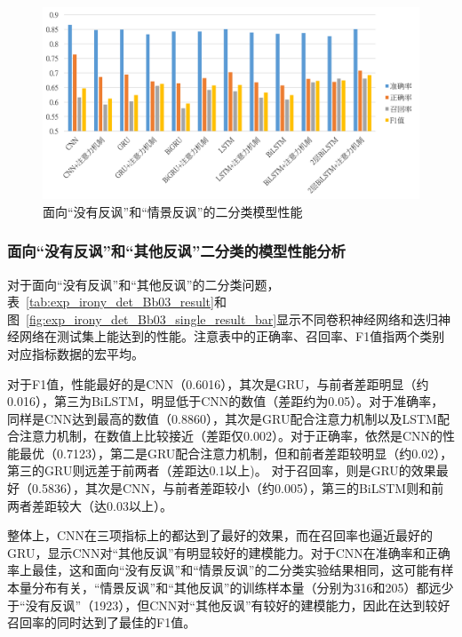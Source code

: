 \begin{figure}[H]
  \centering
  \includegraphics[width=\textwidth]{img/exp_irony_det_Bb02_single_result_bar.png}
  \caption{面向“没有反讽”和“情景反讽”的二分类模型性能}
  \label{fig:exp_irony_det_Bb02_single_result_bar}
\end{figure}

\subsubsection{面向“没有反讽”和“其他反讽”二分类的模型性能分析}

对于面向“没有反讽”和“其他反讽”的二分类问题，表~\ref{tab:exp_irony_det_Bb03_result}和图~\ref{fig:exp_irony_det_Bb03_single_result_bar}显示不同卷积神经网络和迭归神经网络在测试集上能达到的性能。注意表中的正确率、召回率、F1值指两个类别对应指标数据的宏平均。

对于F1值，性能最好的是CNN（0.6016），其次是GRU，与前者差距明显（约0.016），第三为BiLSTM，明显低于CNN的数值（差距约为0.05）。对于准确率，同样是CNN达到最高的数值（0.8860），其次是GRU配合注意力机制以及LSTM配合注意力机制，在数值上比较接近（差距仅0.002）。对于正确率，依然是CNN的性能最优（0.7123），第二是GRU配合注意力机制，但和前者差距较明显（约0.02），第三的GRU则远差于前两者（差距达0.1以上)。 对于召回率，则是GRU的效果最好（0.5836），其次是CNN，与前者差距较小（约0.005），第三的BiLSTM则和前两者差距较大（达0.03以上）。

整体上，CNN在三项指标上的都达到了最好的效果，而在召回率也逼近最好的GRU，显示CNN对“其他反讽”有明显较好的建模能力。对于CNN在准确率和正确率上最佳，这和面向“没有反讽”和“情景反讽”的二分类实验结果相同，这可能有样本量分布有关，“情景反讽”和“其他反讽”的训练样本量（分别为316和205）都远少于“没有反讽”（1923），但CNN对“其他反讽”有较好的建模能力，因此在达到较好召回率的同时达到了最佳的F1值。

